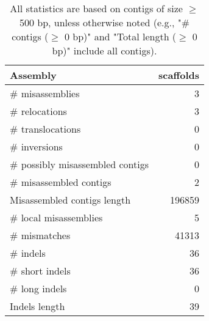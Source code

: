 \documentclass[12pt,a4paper]{article}
\begin{document}
\begin{table}[ht]
\begin{center}
\caption{All statistics are based on contigs of size $\geq$ 500 bp, unless otherwise noted (e.g., "\# contigs ($\geq$ 0 bp)" and "Total length ($\geq$ 0 bp)" include all contigs).}
\begin{tabular}{|l*{1}{|r}|}
\hline
Assembly & scaffolds \\ \hline
\# misassemblies & 3 \\ \hline
\hspace{5mm}\# relocations & 3 \\ \hline
\hspace{5mm}\# translocations & 0 \\ \hline
\hspace{5mm}\# inversions & 0 \\ \hline
\# possibly misassembled contigs & 0 \\ \hline
\# misassembled contigs & 2 \\ \hline
Misassembled contigs length & 196859 \\ \hline
\# local misassemblies & 5 \\ \hline
\# mismatches & 41313 \\ \hline
\# indels & 36 \\ \hline
\hspace{5mm}\# short indels & 36 \\ \hline
\hspace{5mm}\# long indels & 0 \\ \hline
Indels length & 39 \\ \hline
\end{tabular}
\end{center}
\end{table}
\end{document}
